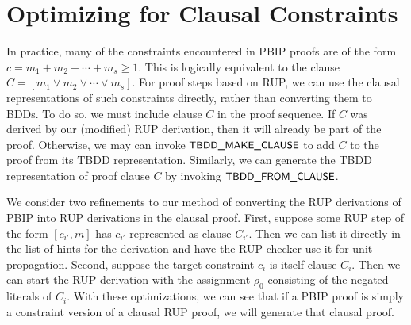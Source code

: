 \documentclass{easychair}
\newcommand{\mlit}{m}
\newcommand{\assign}{\rho}
\newcommand{\fname}[1]{\mbox{\small\sf #1}}
\begin{document}
\section{Optimizing for Clausal Constraints}

In practice, many of the constraints encountered in PBIP proofs are of
the form $c = \mlit_1 + \mlit_2 + \cdots + \mlit_s \geq 1$.  This is logically
equivalent to the clause $C = [\mlit_1 \lor \mlit_2 \lor \cdots \lor  \mlit_s]$.
For proof steps based on RUP, we can use the clausal
representations of such constraints directly, rather than converting
them to BDDs.
To do so, we must include clause $C$ in the proof sequence.  If $C$ was derived by our (modified) RUP
derivation, then it will already be part of the proof.  Otherwise, we may can invoke
$\fname{TBDD\_MAKE\_CLAUSE}$ to add $C$ to the proof from its TBDD representation.
Similarly, we can generate the TBDD representation of proof clause $C$ by invoking 
$\fname{TBDD\_FROM\_CLAUSE}$.

We consider two refinements to our method of converting the RUP
derivations of PBIP into RUP derivations in the clausal proof.  First,
suppose some RUP step of the form $[c_{i'}, \mlit]$ has $c_{i'}$
represented as clause $C_{i'}$.  Then we can list it directly in the
list of hints for the derivation and have the RUP checker use it for
unit propagation.  Second, suppose the target constraint $c_i$ is
itself clause $C_i$.  Then we can start the RUP derivation with the
assignment $\assign_0$ consisting of the negated literals of $C_i$.
With these optimizations, we can see that if a PBIP proof is simply a constraint
version of a clausal RUP proof, we will generate that clausal proof.


\end{document}
